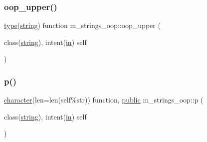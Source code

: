 \mbox{\label{namespacem__strings__oop_a9f4030a1ab2c7e2aa71b9d1f2754e67e}} 
\subsubsection{\texorpdfstring{oop\+\_\+upper()}{oop\_upper()}}
{\footnotesize\ttfamily \hyperlink{stop__watch_83_8txt_a70f0ead91c32e25323c03265aa302c1c}{type}(\hyperlink{structm__strings__oop_1_1string}{string}) function m\+\_\+strings\+\_\+oop\+::oop\+\_\+upper (\begin{DoxyParamCaption}\item[{class(\hyperlink{structm__strings__oop_1_1string}{string}), intent(\hyperlink{M__journal_83_8txt_afce72651d1eed785a2132bee863b2f38}{in})}]{self }\end{DoxyParamCaption})\hspace{0.3cm}{\ttfamily [private]}}

\mbox{\label{namespacem__strings__oop_a456e651940e317c7bc885d95458c7fcb}} 
\subsubsection{\texorpdfstring{p()}{p()}}
{\footnotesize\ttfamily \hyperlink{option__stopwatch_83_8txt_abd4b21fbbd175834027b5224bfe97e66}{character}(len=len(self\%str)) function, \hyperlink{M__stopwatch_83_8txt_a2f74811300c361e53b430611a7d1769f}{public} m\+\_\+strings\+\_\+oop\+::p (\begin{DoxyParamCaption}\item[{class(\hyperlink{structm__strings__oop_1_1string}{string}), intent(\hyperlink{M__journal_83_8txt_afce72651d1eed785a2132bee863b2f38}{in})}]{self }\end{DoxyParamCaption})}

\mbox{\label{namespacem__strings__oop_a64192a93804fcb61ca59725245ee85c2}} 
